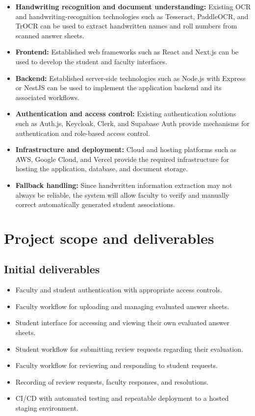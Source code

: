 \documentclass[11pt,a4paper]{article}
\begin{document}
\begin{itemize}[leftmargin=0.7cm]
    \item \textbf{Handwriting recognition and document understanding:} Existing OCR and handwriting-recognition technologies such as Tesseract, PaddleOCR, and TrOCR can be used to extract handwritten names and roll numbers from scanned answer sheets.
    \item \textbf{Frontend:} Established web frameworks such as React and Next.js can be used to develop the student and faculty interfaces.
    \item \textbf{Backend:} Established server-side technologies such as Node.js with Express or NestJS can be used to implement the application backend and its associated workflows.
    \item \textbf{Authentication and access control:} Existing authentication solutions such as Auth.js, Keycloak, Clerk, and Supabase Auth provide mechanisms for authentication and role-based access control.
    \item \textbf{Infrastructure and deployment:} Cloud and hosting platforms such as AWS, Google Cloud, and Vercel provide the required infrastructure for hosting the application, database, and document storage.
    \item \textbf{Fallback handling:} Since handwritten information extraction may not always be reliable, the system will allow faculty to verify and manually correct automatically generated student associations.
\end{itemize}

\section{Project scope and deliverables}
\subsection{Initial deliverables}
\begin{itemize}[leftmargin=0.7cm]
    \item Faculty and student authentication with appropriate access controls.
    \item Faculty workflow for uploading and managing evaluated answer sheets.
    \item Student interface for accessing and viewing their own evaluated answer sheets.
    \item Student workflow for submitting review requests regarding their evaluation.
    \item Faculty workflow for reviewing and responding to student requests.
    \item Recording of review requests, faculty responses, and resolutions.
    \item CI/CD with automated testing and repeatable deployment to a hosted staging environment.
\end{itemize}
\end{document}
